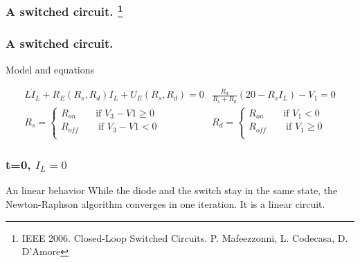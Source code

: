 
\frame
{

\frametitle{A switched circuit. \footnote{IEEE 2006. Closed-Loop Switched Circuits. P. Mafeezzonni, L. Codecasa, D. D'Amore}}
  \begin{figure}[!h]
   \centerline{
   \scalebox{0.9}{
    
    }
 } 
 \end{figure}



 
}

\frame
{

\frametitle{A switched circuit.}
  \begin{figure}[!h]
   \centerline{
   \scalebox{0.9}{
    
    }
 } 
 \end{figure}
\begin{block}{Model and equations}

\begin{equation}
\begin{array}{cc}
L \dot I_L + R_E(R_s,R_d)I_L + U_E(R_s,R_d) =0&
\frac{R_d}{R_s+R_d} (20 - R_sI_L)-V_1=0\\
R_s= \begin{cases}
R_{on} \qquad \text{if $V_3-V1 \geq 0$}\\
R_{off} \qquad \text{if $V_3-V1 < 0$}\\
\end{cases}&
R_d= \begin{cases}
R_{on} \qquad \text{if $V_1 < 0$}\\
R_{off} \qquad \text{if $V_1 \geq 0$}\\
\end{cases}
\end{array}
\end{equation}

\end{block}

 }


 
 \frame
{

\frametitle{t=0, $I_L=0$}
  \begin{figure}[!h]
   \centerline{
   \scalebox{0.9}{
    
    }
 } 
 \end{figure}
 

 \begin{block}{An linear behavior}
While the diode and the switch stay in the same state, the Newton-Raphson algorithm converges in
one iteration. It is a linear circuit.

\end{block}
 }

